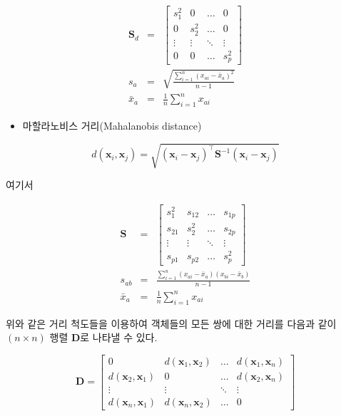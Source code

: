 \documentclass[
]{book}
\providecommand{\tightlist}{%
  \setlength{\itemsep}{0pt}\setlength{\parskip}{0pt}}
\begin{document}
\begin{eqnarray*}
\mathbf{S}_d &=& \begin{bmatrix}
s_1^2 & 0 & \dots & 0\\
0 & s_2^2 & \dots & 0\\
\vdots & \vdots & \ddots & \vdots\\
0 & 0 & \dots & s_p^2
\end{bmatrix}\\
s_a &=& \sqrt{\frac{\sum_{i = 1}^{n} \left(x_{ai} - \bar{x}_a \right)^2}{n - 1}}\\
\bar{x}_a &=& \frac{1}{n} \sum_{i = 1}^{n} x_{ai}
\end{eqnarray*}

\begin{itemize}
\tightlist
\item
  마할라노비스 거리(Mahalanobis distance)
\end{itemize}

\begin{equation*}
d(\mathbf{x}_i, \mathbf{x}_j) = \sqrt{(\mathbf{x}_i - \mathbf{x}_j)^\top \mathbf{S}^{-1} (\mathbf{x}_i - \mathbf{x}_j)}
\end{equation*}

여기서

\begin{eqnarray*}
\mathbf{S} &=& \begin{bmatrix}
s_1^2 & s_{12} & \dots & s_{1p}\\
s_{21} & s_2^2 & \dots & s_{2p}\\
\vdots & \vdots & \ddots & \vdots\\
s_{p1} & s_{p2} & \dots & s_p^2
\end{bmatrix}\\
s_{ab} &=& \frac{\sum_{i = 1}^{n} (x_{ai} - \bar{x}_a)(x_{bi} - \bar{x}_b)}{n - 1}\\
\bar{x}_a &=& \frac{1}{n} \sum_{i = 1}^{n} x_{ai}
\end{eqnarray*}

위와 같은 거리 척도들을 이용하여 객체들의 모든 쌍에 대한 거리를 다음과 같이 \((n \times n)\) 행렬 \(\mathbf{D}\)로 나타낼 수 있다.

\begin{equation*}
\mathbf{D} = \begin{bmatrix}
0 & d(\mathbf{x}_1, \mathbf{x}_2) & \dots & d(\mathbf{x}_1, \mathbf{x}_n)\\
d(\mathbf{x}_2, \mathbf{x}_1) & 0 & \dots & d(\mathbf{x}_2, \mathbf{x}_n)\\
\vdots & \vdots & \ddots & \vdots \\
d(\mathbf{x}_n, \mathbf{x}_1) & d(\mathbf{x}_n, \mathbf{x}_2) & \dots & 0
\end{bmatrix}
\end{equation*}
\end{document}
